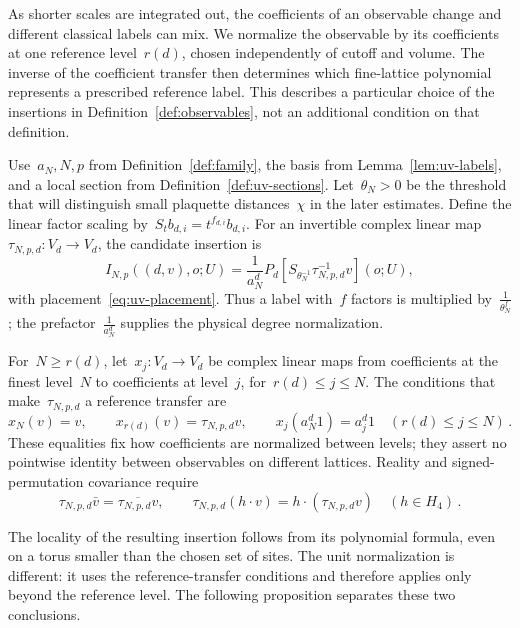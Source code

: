 As shorter scales are integrated out, the coefficients of an observable change and different classical labels can mix.
We normalize the observable by its coefficients at one reference level~$r(d)$, chosen independently of cutoff and volume.
The inverse of the coefficient transfer then determines which fine-lattice polynomial represents a prescribed reference label.
This describes a particular choice of the insertions in Definition~\ref{def:observables}, not an additional condition on that definition.

Use~$a_N,N,p$ from Definition~\ref{def:family}, the basis from Lemma~\ref{lem:uv-labels}, and a local section from Definition~\ref{def:uv-sections}.
Let~$\theta_N>0$ be the threshold that will distinguish small plaquette distances~$\chi$ in the later estimates.
Define the linear factor scaling by~$S_t b_{d,i}=t^{f_{d,i}}b_{d,i}$.
For an invertible complex linear map~$\tau_{N,p,d}:V_d\to V_d$, the candidate insertion is
\begin{equation}\label{eq:uv-insertion}
 I_{N,p}((d,v),o;U)
 =\frac{1}{a_N^d}P_d\!\left[S_{\theta_N^{-1}}\tau_{N,p,d}^{-1}v\right](o;U),
\end{equation}
with placement~\eqref{eq:uv-placement}.
Thus a label with~$f$ factors is multiplied by~$\frac{1}{\theta_N^f}$; the prefactor~$\frac{1}{a_N^d}$ supplies the physical degree normalization.

For~$N\ge r(d)$, let~$x_j:V_d\to V_d$ be complex linear maps from coefficients at the finest level~$N$ to coefficients at level~$j$, for~$r(d)\le j\le N$.
The conditions that make~$\tau_{N,p,d}$ a reference transfer are
\begin{equation}\label{eq:uv-reference-coordinates}
 x_N(v)=v,\qquad x_{r(d)}(v)=\tau_{N,p,d}v,\qquad
 x_j(a_N^d1)=a_j^d1\quad(r(d)\le j\le N)\,.
\end{equation}
These equalities fix how coefficients are normalized between levels; they assert no pointwise identity between observables on different lattices.
Reality and signed-permutation covariance require
\begin{equation}\label{eq:uv-transfer-symmetry}
 \tau_{N,p,d}\bar v=\overline{\tau_{N,p,d}v},\qquad
 \tau_{N,p,d}(h\cdot v)=h\cdot(\tau_{N,p,d}v)\quad(h\in H_4)\,.
\end{equation}

The locality of the resulting insertion follows from its polynomial formula, even on a torus smaller than the chosen set of sites.
The unit normalization is different: it uses the reference-transfer conditions and therefore applies only beyond the reference level.
The following proposition separates these two conclusions.

